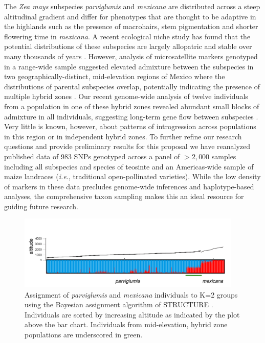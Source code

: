 The \emph {Zea mays} subspecies \emph{parviglumis} and \emph{mexicana} are distributed across a steep altitudinal gradient and differ for phenotypes that are thought to be adaptive in the highlands such as the presence of macrohairs, stem pigmentation and shorter flowering time in \emph{mexicana}.
A recent ecological niche study has found that the potential distributions of these subspecies are largely allopatric and stable over many thousands of years \citep{hufford2012inferences}.
However, analysis of microsatellite markers genotyped in a range-wide sample suggested elevated admixture between the subspecies in two geographically-distinct, mid-elevation regions of Mexico where the distributions of parental subspecies overlap, potentially indicating the presence of multiple hybrid zones \citep{Fukunaga2005}.  
Our recent genome-wide analysis of twelve individuals from a population in one of these hybrid zones revealed abundant small blocks of admixture in all individuals, suggesting long-term gene flow between subspecies \citep{Pyhajarvi2013}.  
Very little is known, however, about patterns of introgression across populations in this region or in independent hybrid zones.
To further refine our research questions and provide preliminary results for this proposal we have reanalyzed published data \citep{Fang2012} of 983 SNPs genotyped across a panel of $>2,000$ samples including all subspecies and species of teosinte and an Americas-wide sample of maize landraces (\emph{i.e.}, traditional open-pollinated varieties).
While the low density of markers in these data precludes genome-wide inferences and haplotype-based analyses, the comprehensive taxon sampling makes this an ideal resource for guiding future research.

\begin{figure}[t] 
  \centering
   \includegraphics[width=0.95\textwidth]{structure.pdf}
    \caption{Assignment of \emph{parviglumis} and \emph{mexicana} individuals to K=2 groups using the Bayesian assignment algorithm of STRUCTURE \citep{Pritchard2000}.  Individuals are sorted by increasing altitude as indicated by the plot above the bar chart. Individuals from mid-elevation, hybrid zone populations are underscored in green.} 
\label{fig:structure}
\end{figure}

